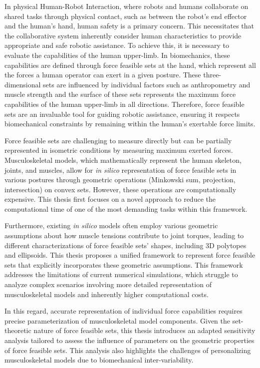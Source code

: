 In physical Human-Robot Interaction, where robots and humans collaborate on shared tasks through physical contact, such as between the robot's end effector and the human's hand, human safety is a primary concern. This necessitates that the collaborative system inherently consider human characteristics to provide appropriate and safe robotic assistance. To achieve this, it is necessary to evaluate the capabilities of the human upper-limb. In biomechanics, these capabilities are defined through force feasible sets at the hand, which represent all the forces a human operator can exert in a given posture. These three-dimensional sets are influenced by individual factors such as anthropometry and muscle strength and the surface of these sets represents the maximum force capabilities of the human upper-limb in all directions. Therefore, force feasible sets are an invaluable tool for guiding robotic assistance, ensuring it respects biomechanical constraints by remaining within the human's exertable force limits.

Force feasible sets are challenging to measure directly but can be partially represented in isometric conditions by measuring maximum exerted forces. Musculoskeletal models, which mathematically represent the human skeleton, joints, and muscles, allow for \emph{in silico} representation of force feasible sets in various postures through geometric operations (Minkowski sum, projection, intersection) on convex sets. However, these operations are computationally expensive. This thesis first focuses on a novel approach to reduce the computational time of one of the most demanding tasks within this framework.

Furthermore, existing \emph{in silico} models often employ various geometric assumptions about how muscle tensions contribute to joint torques, leading to different characterizations of force feasible sets' shapes, including 3D polytopes and ellipsoids. This thesis proposes a unified framework to represent force feasible sets that explicitly incorporates these geometric assumptions. This framework addresses the limitations of current numerical simulations, which struggle to analyze complex scenarios involving more detailed representation of musculoskeletal models and inherently higher computational costs.

In this regard, accurate representation of individual force capabilities requires precise parameterization of musculoskeletal model components. Given the set-theoretic nature of force feasible sets, this thesis introduces an adapted sensitivity analysis tailored to assess the influence of parameters on the geometric properties of force feasible sets. This analysis also highlights the challenges of personalizing musculoskeletal models due to biomechanical inter-variability.

